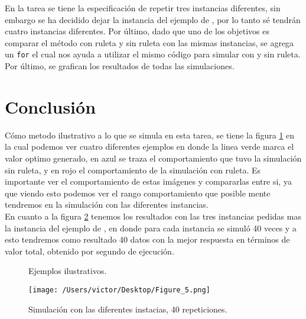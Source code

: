 \documentclass{article}
\begin{document}
En la tarea se tiene la especificación de repetir tres instancias diferentes, sin embargo se ha decidido dejar la instancia del ejemplo de \citet{DRA.Code}, por lo tanto sé tendrán cuatro instancias diferentes. Por último, dado que uno de los objetivos es comparar el método con ruleta y  sin ruleta con las mismas instancias, se agrega un \texttt{for} el cual nos ayuda a utilizar el mismo código para simular con y sin ruleta. Por último, se grafican los resultados de todas las simulaciones.



\section{Conclusión}

Cómo metodo ilustrativo a lo que se simula en esta tarea, se tiene la figura \ref{f1} en la cual podemos ver cuatro diferentes ejemplos en donde la linea verde marca el valor optimo generado, en azul se traza el comportamiento que tuvo la simulación sin ruleta, y en rojo el comportamiento de la simulación con ruleta. Es importante ver el comportamiento de estas imágenes y compararlas entre si, ya que viendo esto podemos ver el rango comportamiento que posible mente tendremos en la simulación con las diferentes instancias.\\

En cuanto a la figura \ref{f2} tenemos los resultados con las tres instancias pedidas mas la instancia del ejemplo de \citet{DRA.Code}, en donde para cada instancia se simuló 40 veces y a esto tendremos como resultado 40 datos con la mejor respuesta en términos de valor total, obtenido por segundo de ejecución. 

\begin{figure}[H]
\centering
{}
\caption{Ejemplos ilustrativos.} 
\label{f1}
\end{figure}

\begin{figure}[H]
\begin{center}
	\texttt{[image: /Users/victor/Desktop/Figure\_5.png]}
	\caption{ Simulación con las diferentes instacias, 40 repeticiones.}
	\label{f2}
\end{center}
\end{figure}
\end{document}

